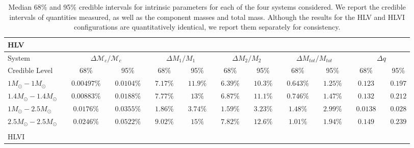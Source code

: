 \documentclass[11pt,a4paper]{emulateapj} 
\newcommand{\chmass}{\mathcal{M}_c}
\begin{document}
\begin{table}[h!]
\centering
\caption{Median 68\% and 95\% credible intervals for intrinsic parameters for
  each of the four systems considered.  We report the credible
  intervals of quantities measured, as well as the component masses
  and total mass.  Although the results for the HLV and HLVI
  configurations are quantitatively identical, we report them
  separately for consistency.}
  \tabcolsep=0.11cm
      {\renewcommand{\arraystretch}{1.3} 
\begin{tabular}{lcccccccccccccccccccc}


\\ HLV\\

 \hline\hline System & \vline & \multicolumn{3}{c}{$\Delta \chmass / \chmass$} &
\vline & \multicolumn{3}{c}{$\Delta M_1 / M_1$} & \vline & \multicolumn{3}{c}{$\Delta M_2 / M_2$} & \vline &
\multicolumn{3}{c}{$\Delta M_{tot}/M_{tot}$} & \vline & \multicolumn{3}{c}{$\Delta q$}\\ \hline
Credible Level & \vline & 68\% & \vline & 95\% & \vline & 68\% & \vline & 95\% & \vline & 68\% & \vline & 95\% & \vline & 68\% & \vline & 95\% & \vline & 68\% & \vline & 95\% \\
\hline\hline

$1M_{\odot}-1M_{\odot}$ & \vline &$0.00497\%$ & \vline &$0.0104\%$ & \vline & $7.17\%$ & \vline &$11.9\%$ & \vline & $6.39\%$ & \vline &$10.3\%$ & \vline & $0.643\%$ & \vline &$1.25\%$ & \vline & $0.123$ & \vline &$0.197$\\\hline$1.4M_{\odot}-1.4M_{\odot}$ & \vline &$0.00883\%$ & \vline &$0.0188\%$ & \vline & $7.77\%$ & \vline &$13\%$ & \vline & $6.87\%$ & \vline &$11.1\%$ & \vline & $0.746\%$ & \vline &$1.47\%$ & \vline & $0.132$ & \vline &$0.212$\\\hline$1M_{\odot}-2.5M_{\odot}$ & \vline &$0.0176\%$ & \vline &$0.0355\%$ & \vline & $1.86\%$ & \vline &$3.74\%$ & \vline & $1.59\%$ & \vline &$3.23\%$ & \vline & $1.48\%$ & \vline &$2.99\%$ & \vline & $0.0138$ & \vline &$0.028$\\\hline$2.5M_{\odot}-2.5M_{\odot}$ & \vline &$0.0246\%$ & \vline &$0.0522\%$ & \vline & $9.02\%$ & \vline &$15\%$ & \vline & $7.82\%$ & \vline &$12.6\%$ & \vline & $1.01\%$ & \vline &$1.94\%$ & \vline & $0.149$ & \vline &$0.239$\\

\hline
\hline

\\HLVI\\


\end{tabular}}
\end{table}
\end{document}
